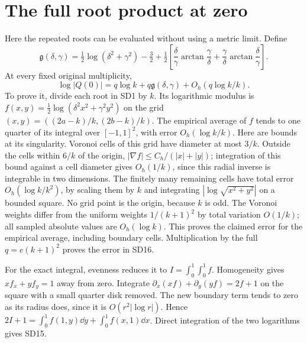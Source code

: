 \documentclass[11pt]{article}
\begin{document}
\section{The full root product at zero}
Here the repeated roots can be evaluated without using a metric limit.
Define
\begin{equation}\tag{SD15}
\mathfrak g(\delta,\gamma)=
\tfrac12\log(\delta^2+\gamma^2)-\tfrac32
+\tfrac12\left[\frac\delta\gamma\arctan\frac\gamma\delta
+\frac\gamma\delta\arctan\frac\delta\gamma\right].
\end{equation}
At every fixed original multiplicity,
\begin{equation}\tag{SD16}
\boxed{\log|Q(0)|=q\log k+q\mathfrak g(\delta,\gamma)
+O_h(q\log k/k).}
\end{equation}
To prove it, divide each root in SD1 by $k$. Its logarithmic modulus is
$f(x,y)=\tfrac12\log(\delta^2x^2+\gamma^2y^2)$ on the grid
$(x,y)=((2a-k)/k,(2b-k)/k)$. The empirical average of $f$ tends to
one quarter of its integral over $[-1,1]^2$, with error
$O_h(\log k/k)$. Here are bounds at its singularity. Voronoi cells
of this grid have diameter at most $3/k$. Outside the cells within
$6/k$ of the origin, $|\nabla f|\le C_h/(|x|+|y|)$; integration
of this bound against a cell diameter gives $O_h(1/k)$, since this
radial inverse is integrable in two dimensions. The finitely many
remaining cells have total error $O_h(\log k/k^2)$, by scaling them
by $k$ and integrating $|\log\sqrt{x^2+y^2}|$ on a bounded square.
No grid point is the origin, because $k$ is odd. The Voronoi weights
differ from the uniform weights $1/(k+1)^2$ by total variation
$O(1/k)$; all sampled absolute values are $O_h(\log k)$. This proves
the claimed error for the empirical average, including boundary cells.
Multiplication by the full $q=e(k+1)^2$ proves the error in SD16.

For the exact integral, evenness reduces it to $I=\int_0^1\int_0^1f$.
Homogeneity gives $xf_x+yf_y=1$ away from zero. Integrate
$\partial_x(xf)+\partial_y(yf)=2f+1$ on the square with a small
quarter disk removed. The new boundary term tends to zero as its
radius does, since it is $O(r^2|\log r|)$. Hence
$2I+1=\int_0^1f(1,y)\dd y+\int_0^1f(x,1)\dd x$.
Direct integration of the two logarithms gives SD15.
\end{document}
